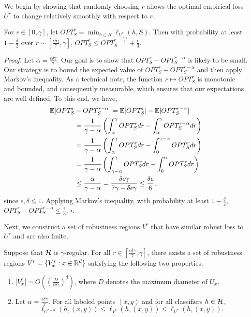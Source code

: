 We begin by showing that randomly choosing $r$ allows the optimal empirical loss $U^r$ to change relatively smoothly with respect to $r.$
\begin{lem}\label{lem:r_works}
For $r \in [0, \gamma]$, let $OPT_S^r = \min_{h \in H} \ell_{U^r}(h, S)$. Then with probability at least $1 - \frac{\delta}{2}$ over $r \sim [\frac{\epsilon\delta\gamma}{7}, \gamma]$, $OPT_S^r \leq OPT_S^{r -\frac{\epsilon\delta\gamma}{7}} + \frac{\epsilon}{3}.$
\end{lem}
\textit{Proof. }Let $\alpha = \frac{\epsilon\delta\gamma}{7}.$ Our goal is to show that $OPT_S^r - OPT_S^{r-\alpha}$ is likely to be small. Our strategy is to bound the expected value of $OPT_S^r - OPT_S^{r-\alpha}$ and then apply Markov's inequality. As a technical note, the function $r \mapsto OPT_S^r$ is monotonic and bounded, and consequently measurable, which ensures that our expectations are well defined. To this end, we have,
\begin{equation*}
\begin{split}
\mathbb{E}[OPT_S^r &- OPT_S^{r-\alpha}] = \mathbb{E}[OPT_S^r] - \mathbb{E}[OPT_S^{r-\alpha}] \\
&= \frac{1}{\gamma - \alpha}\left(\int_\alpha^\gamma OPT_S^rdr - \int_\alpha^\gamma OPT_S^{r-\alpha}dr \right) \\
&= \frac{1}{\gamma - \alpha}\left(\int_\alpha^\gamma OPT_S^rdr - \int_0^{\gamma-\alpha} OPT_S^rdr \right) \\
&= \frac{1}{\gamma - \alpha}\left(\int_{\gamma-\alpha}^\gamma OPT_S^rdr - \int_0^{\alpha} OPT_S^rdr \right) \\
&\leq \frac{\alpha}{\gamma - \alpha} = \frac{\delta\epsilon\gamma}{7\gamma - \delta\epsilon\gamma} \leq \frac{\delta\epsilon}{6},
\end{split}
\end{equation*}
since $\epsilon, \delta \leq 1$. Applying Markov's inequality, with probability at least $1 - \frac{\delta}{2}$, $OPT_S^r - OPT_S^{r-\alpha} \leq \frac{\epsilon}{3}$. $\square$.


Next, we construct a set of robustness regions $V^r$ that have similar robust loss to $U^r$ and are also finite.

\begin{lem}\label{lem:v_construct}
Suppose that $\mathcal H$ is $\gamma$-regular. For all $r \in [\frac{\epsilon\delta\gamma}{7}, \gamma]$, there exists a set of robustness regions $V^r = \{V_x^r: x \in \mathbb{R}^d\}$ satisfying the following two properties.  
\begin{enumerate}
	\item $|V_x^r| = O\left(\left(\frac{D}{\epsilon\delta\gamma}\right)^d\right)$, where $D$ denotes the maximum diameter of $U_x$. 
	\item Let $\alpha = \frac{\epsilon\delta\gamma}{7}$. For all labeled points $(x,y)$ and for all classifiers $h \in \mathcal H$, $$\ell_{U^{r - \alpha}}(h, (x,y)) \leq \ell_{V^r}(h, (x,y)) \leq \ell_{U^r}(h, (x,y)).$$
\end{enumerate}
\end{lem}

